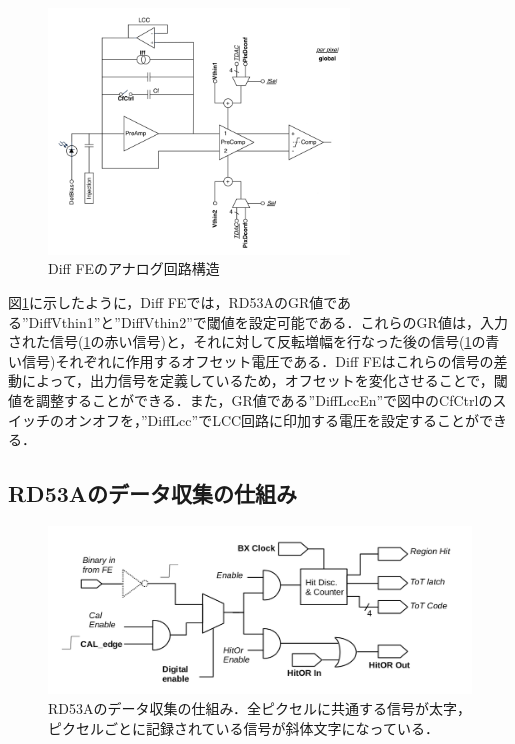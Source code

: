 \begin{figure}[h]
\centering
\includegraphics[width=8cm]{./figure/RD53A_DiffFE.png}
\caption{Diff FEのアナログ回路構造}
\label{fig:DiffFE}
\end{figure}

図\ref{fig:DiffFE}に示したように，Diff FEでは，RD53AのGR値である''DiffVthin1''と''DiffVthin2''で閾値を設定可能である．これらのGR値は，入力された信号(\ref{fig:DiffFE}の赤い信号)と，それに対して反転増幅を行なった後の信号(\ref{fig:DiffFE}の青い信号)それぞれに作用するオフセット電圧である．Diff FEはこれらの信号の差動によって，出力信号を定義しているため，オフセットを変化させることで，閾値を調整することができる．また，GR値である''DiffLccEn''で図中のCfCtrlのスイッチのオンオフを，''DiffLcc''でLCC回路に印加する電圧を設定することができる．

\subsection{RD53Aのデータ収集の仕組み}

\begin{figure}[h]
  \centering
  \includegraphics[width=13cm]{./figure/RD53Aproc.png}
  \caption{RD53Aのデータ収集の仕組み．全ピクセルに共通する信号が太字，ピクセルごとに記録されている信号が斜体文字になっている．}
  \label{fig:RD53Aproc}
\end{figure}

